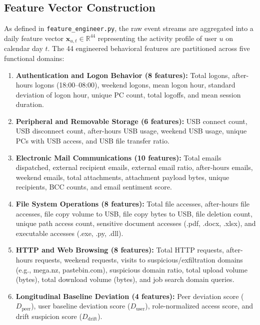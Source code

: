 \documentclass[conference]{IEEEtran}
\begin{document}
\subsection{Feature Vector Construction}
As defined in \texttt{feature\_engineer.py}, the raw event streams are aggregated into a daily feature vector $\mathbf{x}_{u,t} \in \mathbb{R}^{44}$ representing the activity profile of user $u$ on calendar day $t$. The 44 engineered behavioral features are partitioned across five functional domains:
\begin{enumerate}
    \item \textbf{Authentication and Logon Behavior (8 features):} Total logons, after-hours logons (18:00--08:00), weekend logons, mean logon hour, standard deviation of logon hour, unique PC count, total logoffs, and mean session duration.
    \item \textbf{Peripheral and Removable Storage (6 features):} USB connect count, USB disconnect count, after-hours USB usage, weekend USB usage, unique PCs with USB access, and USB file transfer ratio.
    \item \textbf{Electronic Mail Communications (10 features):} Total emails dispatched, external recipient emails, external email ratio, after-hours emails, weekend emails, total attachments, attachment payload bytes, unique recipients, BCC counts, and email sentiment score.
    \item \textbf{File System Operations (8 features):} Total file accesses, after-hours file accesses, file copy volume to USB, file copy bytes to USB, file deletion count, unique path access count, sensitive document accesses (.pdf, .docx, .xlsx), and executable accesses (.exe, .py, .dll).
    \item \textbf{HTTP and Web Browsing (8 features):} Total HTTP requests, after-hours requests, weekend requests, visits to suspicious/exfiltration domains (e.g., mega.nz, pastebin.com), suspicious domain ratio, total upload volume (bytes), total download volume (bytes), and job search domain queries.
    \item \textbf{Longitudinal Baseline Deviation (4 features):} Peer deviation score ($D_{\text{peer}}$), user baseline deviation score ($D_{\text{user}}$), role-normalized access score, and drift suspicion score ($D_{\text{drift}}$).
\end{enumerate}
\end{document}
